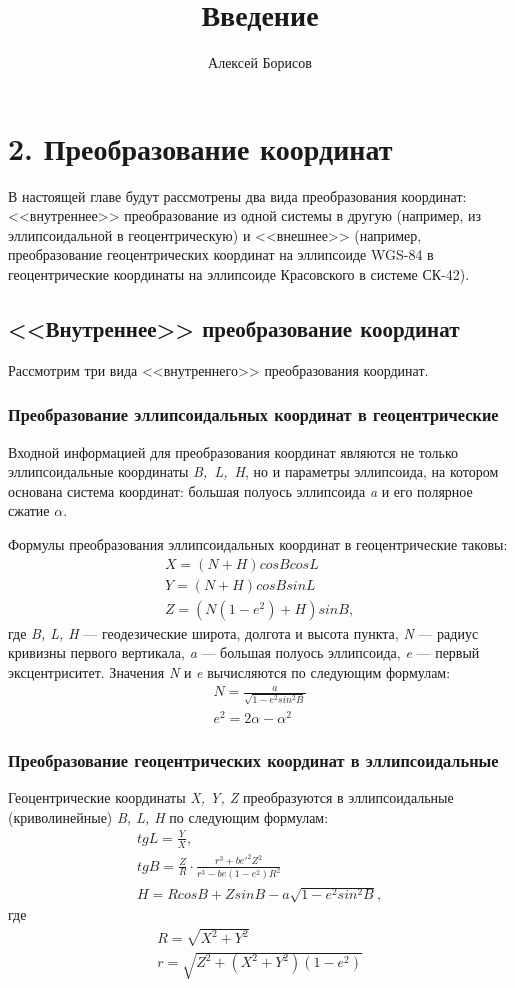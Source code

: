 \documentclass[12pt]{report}
\title{Введение}
\author{Алексей Борисов}
\begin{document}
\chapter*{2. Преобразование координат}
В настоящей главе будут рассмотрены два вида преобразования координат: <<внутреннее>> преобразование из одной системы в другую  (например, из эллипсоидальной в геоцентрическую) и <<внешнее>> (например, преобразование геоцентрических координат на эллипсоиде WGS-84 в геоцентрические координаты на эллипсоиде Красовского в системе СК-42).
\section*{<<Внутреннее>> преобразование координат}
Рассмотрим три вида <<внутреннего>> преобразования координат.
\subsection*{Преобразование эллипсоидальных координат в геоцентрические}
Входной информацией для преобразования координат являются не только эллипсоидальные координаты \textit{B,~L,~H}, но и параметры эллипсоида, на котором основана система координат: большая полуось эллипсоида \textit{a} и его полярное сжатие \textit{$\alpha$}.
\par
Формулы преобразования эллипсоидальных координат в геоцентрические таковы:
\begin{eqnarray}
X = (N + H)cosB cosL\\
Y = (N+H)cosB sinL\\
Z = (N(1-e^2)+H)sinB,
\end{eqnarray}
где \textit{B, L, H} --- геодезические широта, долгота и высота пункта, \textit{N} --- радиус кривизны первого вертикала, \textit{a} --- большая полуось эллипсоида, \textit{e} --- первый эксцентриситет. Значения  \textit{N} и  \textit{e} вычисляются по следующим формулам:
\begin{eqnarray}
N = \frac {a}{\sqrt {1 - e^2 sin^2 B} }
\\
e^2 = 2\alpha - \alpha^2
\end{eqnarray}
\subsection*{Преобразование геоцентрических координат в эллипсоидальные}
Геоцентрические координаты \textit{X, Y, Z} преобразуются в эллипсоидальные (криволинейные) \textit{B, L, H} по следующим формулам:
\begin{eqnarray}
tg L = \frac{Y}{X},
\\
tgB = \frac{Z}{R} \cdot \frac{r^3 + be'^2  Z^2}{r^3 - be(1-e^2)R^2}
\\
H = R cosB + Z sinB - a\sqrt{1 - e^2 sin^2 B},
\end{eqnarray}
где
\begin{eqnarray}
R = \sqrt{X^2 + Y^2}
\\
r = \sqrt{Z^2 +(X^2 + Y^2)(1 - e^2)}
\end{eqnarray}
\end{document}
